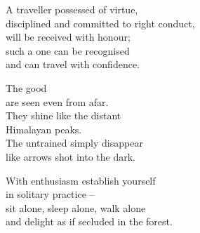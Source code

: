 A traveller possessed of virtue,\\
disciplined and committed to right conduct,\\
will be received with honour;\\
such a one can be recognised\\
and can travel with confidence.


The good\\
are seen even from afar.\\
They shine like the distant\\
Himalayan peaks.\\
The untrained simply disappear\\
like arrows shot into the dark.


With enthusiasm establish yourself\\
in solitary practice --\\
sit alone, sleep alone, walk alone\\
and delight as if secluded in the forest.

